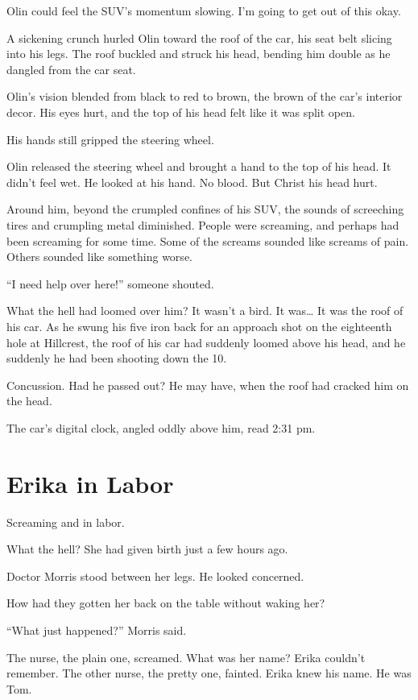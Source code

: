 Olin could feel the SUV’s momentum slowing. I’m going to get out of this okay.

A sickening crunch hurled Olin toward the roof of the car, his seat belt slicing into his legs. The roof buckled and struck his head, bending him double as he dangled from the car seat.

Olin’s vision blended from black to red to brown, the brown of the car’s interior decor. His eyes hurt, and the top of his head felt like it was split open.

His hands still gripped the steering wheel.

Olin released the steering wheel and brought a hand to the top of his head. It didn’t feel wet. He looked at his hand. No blood. But Christ his head hurt.

Around him, beyond the crumpled confines of his SUV, the sounds of screeching tires and crumpling metal diminished. People were screaming, and perhaps had been screaming for some time. Some of the screams sounded like screams of pain. Others sounded like something worse.

“I need help over here!” someone shouted.

What the hell had loomed over him? It wasn’t a bird. It was… It was the roof of his car. As he swung his five iron back for an approach shot on the eighteenth hole at Hillcrest, the roof of his car had suddenly loomed above his head, and he suddenly he had been shooting down the 10.

Concussion. Had he passed out? He may have, when the roof had cracked him on the head.

The car’s digital clock, angled oddly above him, read 2:31 pm.



\section{Erika in Labor}

 Screaming and in labor.

What the hell? She had given birth just a few hours ago.

Doctor Morris stood between her legs. He looked concerned.

How had they gotten her back on the table without waking her?

“What just happened?” Morris said.

The nurse, the plain one, screamed. What was her name? Erika couldn’t remember. The other nurse, the pretty one, fainted. Erika knew his name. He was Tom.

